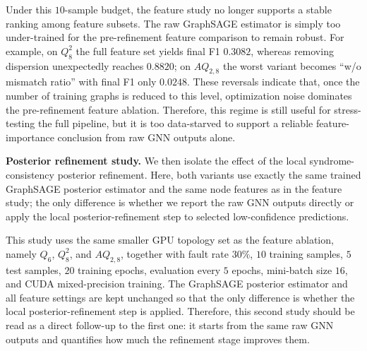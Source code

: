 Under this $10$-sample budget, the feature study no longer supports a stable ranking among feature subsets. The raw GraphSAGE estimator is simply too under-trained for the pre-refinement feature comparison to remain robust. For example, on $Q_8^2$ the full feature set yields final F1 $0.3082$, whereas removing dispersion unexpectedly reaches $0.8820$; on $AQ_{2,8}$ the worst variant becomes ``w/o mismatch ratio'' with final F1 only $0.0248$. These reversals indicate that, once the number of training graphs is reduced to this level, optimization noise dominates the pre-refinement feature ablation. Therefore, this regime is still useful for stress-testing the full pipeline, but it is too data-starved to support a reliable feature-importance conclusion from raw GNN outputs alone.

\noindent\textbf{Posterior refinement study.}
We then isolate the effect of the local syndrome-consistency posterior refinement. Here, both variants use exactly the same trained GraphSAGE posterior estimator and the same node features as in the feature study; the only difference is whether we report the raw GNN outputs directly or apply the local posterior-refinement step to selected low-confidence predictions.

This study uses the same smaller GPU topology set as the feature ablation, namely $Q_6$, $Q_8^2$, and $AQ_{2,8}$, together with fault rate $30\%$, $10$ training samples, $5$ test samples, $20$ training epochs, evaluation every $5$ epochs, mini-batch size $16$, and CUDA mixed-precision training. The GraphSAGE posterior estimator and all feature settings are kept unchanged so that the only difference is whether the local posterior-refinement step is applied. Therefore, this second study should be read as a direct follow-up to the first one: it starts from the same raw GNN outputs and quantifies how much the refinement stage improves them.

